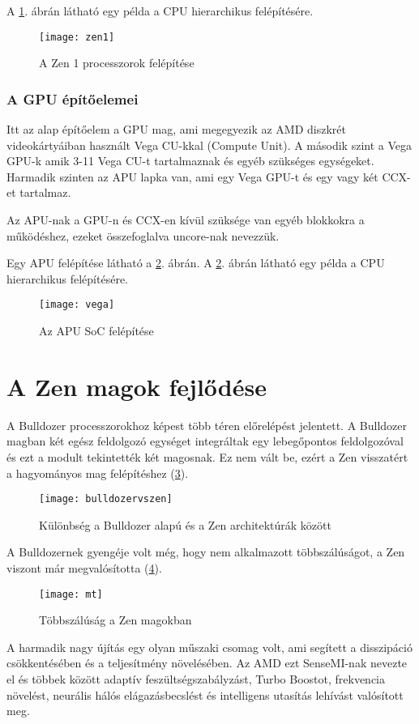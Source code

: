 A \ref{fig:zen1}. ábrán látható egy példa a CPU hierarchikus felépítésére.
\begin{figure}[H]
    \texttt{[image: zen1]}
    \centering
    \caption{A Zen 1 processzorok felépítése}
    \label{fig:zen1}
\end{figure}

\subsubsection{A GPU építőelemei}
Itt az alap építőelem a GPU mag, ami megegyezik az AMD diszkrét videokártyáiban használt Vega CU-kkal (Compute Unit).
A második szint a Vega GPU-k amik 3-11 Vega CU-t tartalmaznak és egyéb szükséges egységeket.
Harmadik szinten az APU lapka van, ami egy Vega GPU-t és egy vagy két CCX-et tartalmaz.

Az APU-nak a GPU-n és CCX-en kívül szüksége van egyéb blokkokra a működéshez, ezeket összefoglalva uncore-nak nevezzük.

Egy APU felépítése látható a \ref{fig:vega}. ábrán.
A \ref{fig:vega}. ábrán látható egy példa a CPU hierarchikus felépítésére.
\begin{figure}[H]
    \texttt{[image: vega]}
    \centering
    \caption{Az APU SoC felépítése}
    \label{fig:vega}
\end{figure}

\section{A Zen magok fejlődése}
A Bulldozer processzorokhoz képest több téren előrelépést jelentett.
A Bulldozer magban két egész feldolgozó egységet integráltak egy lebegőpontos feldolgozóval és ezt a modult tekintették két magosnak.
Ez nem vált be, ezért a Zen visszatért a hagyományos mag felépítéshez (\ref{fig:bulldozervszen}).
\begin{figure}[H]
    \texttt{[image: bulldozervszen]}
    \centering
    \caption{Különbség a Bulldozer alapú és a Zen architektúrák között}
    \label{fig:bulldozervszen}
\end{figure}
A Bulldozernek gyengéje volt még, hogy nem alkalmazott többszálúságot, a Zen viszont már megvalósította (\ref{fig:mt}).
\begin{figure}[H]
    \texttt{[image: mt]}
    \centering
    \caption{Többszálúság a Zen magokban}
    \label{fig:mt}
\end{figure}
A harmadik nagy újítás egy olyan műszaki csomag volt, ami segített a disszipáció csökkentésében és a teljesítmény növelésében.
Az AMD ezt SenseMI-nak nevezte el és többek között adaptív feszültségszabályzást, Turbo Boostot, frekvencia növelést, neurális hálós elágazásbecslést és intelligens utasítás lehívást valósított meg.

